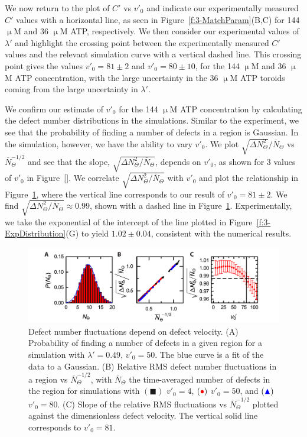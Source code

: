 We now return to the plot of $C'$ vs $v'_0$ and indicate our experimentally measured $C'$ values with a horizontal line, as seen in Figure~\ref{f:3-MatchParam}(B,C) for 144 $\upmu$M and 36 $\upmu$M ATP, respectively.
We then consider our experimental values of $\lambda'$  and highlight the crossing point between the experimentally measured $C'$ values and the relevant simulation curve with a vertical dashed line.
This crossing point gives the values $v'_0 = 81 \pm 2$ and $v'_0 = 80 \pm 10$, for the 144 $\upmu$M and 36 $\upmu$M ATP concentration, with the large uncertainty in the 36 $\upmu$M ATP toroids coming from the large uncertainty in $\lambda'$.

We confirm our estimate of $v'_0$ for the 144 $\upmu$M ATP concentration by calculating the defect number distributions in the simulations.
Similar to the experiment, we see that the probability of finding a number of defects in a region is Gaussian.
In the simulation, however, we have the ability to vary $v'_0$.
We plot $\displaystyle{\sqrt{\Delta N_{\Theta}^2}} \bigg / \displaystyle {\overbar{N}_{\Theta}}$ vs $\overbar{N}_{\Theta}^{-1/2}$ and see that the slope, $\displaystyle \sqrt{\Delta N_{\Theta}^2 \big / \overbar{N}_{\Theta}}$, depends on $v'_0$, as shown for 3 values of $v'_0$ in Figure~\ref{}.
We correlate $\displaystyle \sqrt{\Delta N_{\Theta}^2 \big / \overbar{N}_{\Theta}}$ with $v'_0$ and plot the relationship in Figure~\ref{f:3-MatchDist}, where the vertical line corresponds to our result of $v'_0 = 81 \pm 2$.
We find $\displaystyle \sqrt{\Delta N_{\Theta}^2 \big / \overbar{N}_{\Theta}} \approx 0.99$, shown with a dashed line in Figure~\ref{f:3-MatchDist}.
Experimentally, we take the exponential of the intercept of the line plotted in Figure~\ref{f:3-ExpDistribution}(G) to yield $1.02 \pm 0.04$, consistent with the numerical results.
\begin{figure}
  \centering
  \includegraphics{figures/C3/Ch3-Figs_MatchDist.png}
  \caption{Defect number fluctuations depend on defect velocity.
  (A) Probability of finding a number of defects in a given region for a simulation with $\lambda' = 0.49$, $v'_0 = 50$. The blue curve is a fit of the data to a Gaussian.
  (B) Relative RMS defect number fluctuations in a region vs $\overbar{N}_{\Theta}^{-1/2}$, with $\overbar{N}_{\Theta}$ the time-averaged number of defects in the region for simulations with
  $({\blacksquare})$ $v'_0 = 4$,
  $({\color{red} \bullet})$ $v'_0 = 50$, and
  $({\color{blue} \blacktriangle})$ $v'_0 = 80$.
  (C) Slope of the relative RMS fluctuations vs $\overbar{N}_{\Theta}^{-1/2}$ plotted against the dimensionless defect velocity. The vertical solid line corresponds to $v'_0 = 81$.}\label{f:3-MatchDist}
\end{figure}

